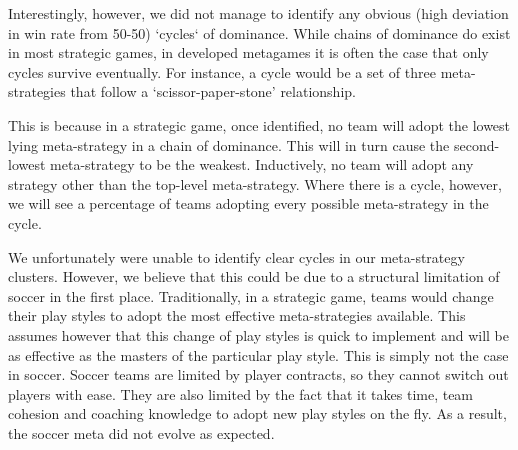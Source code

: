 \documentclass{article}
\begin{document}
\par Interestingly, however, we did not manage to identify any obvious (high deviation in win rate from 50-50) `cycles` of dominance. While chains of dominance do exist in most strategic games, in developed metagames it is often the case that only cycles survive eventually. For instance, a cycle would be a set of three meta-strategies that follow a `scissor-paper-stone' relationship. 
\par This is because in a strategic game, once identified, no team will adopt the lowest lying meta-strategy in a chain of dominance. This will in turn cause the second-lowest meta-strategy to be the weakest. Inductively, no team will adopt any strategy other than the top-level meta-strategy. Where there is a cycle, however, we will see a percentage of teams adopting every possible meta-strategy in the cycle. 
\par We unfortunately were unable to identify clear cycles in our meta-strategy clusters. However, we believe that this could be due to a structural limitation of soccer in the first place. Traditionally, in a strategic game, teams would change their play styles to adopt the most effective meta-strategies available. This assumes however that this change of play styles is quick to implement and will be as effective as the masters of the particular play style. This is simply not the case in soccer. Soccer teams are limited by player contracts, so they cannot switch out players with ease. They are also limited by the fact that it takes time, team cohesion and coaching knowledge to adopt new play styles on the fly. As a result, the soccer meta did not evolve as expected.
\end{document}
